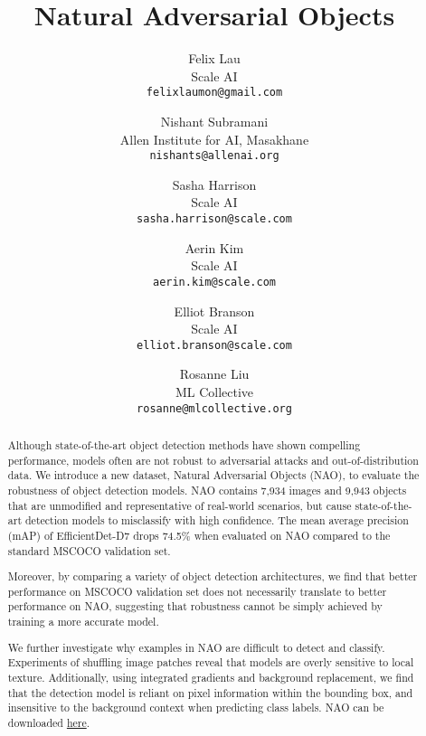 \documentclass[final]{cvpr}
\begin{document}
\title{Natural Adversarial Objects}

\author{Felix Lau\\
Scale AI\\
{\tt\small felixlaumon@gmail.com}
\and
Nishant Subramani\\
Allen Institute for AI, Masakhane\\
{\tt\small nishants@allenai.org}
\and
Sasha Harrison\\
Scale AI\\
{\tt\small sasha.harrison@scale.com}
\and
Aerin Kim\\
Scale AI\\
{\tt\small aerin.kim@scale.com}
\and
Elliot Branson\\
Scale AI\\
{\tt\small elliot.branson@scale.com}
\and
Rosanne Liu\\
ML Collective\\
{\tt\small rosanne@mlcollective.org}
}
\maketitle


\begin{abstract}
Although state-of-the-art object detection methods have shown compelling performance, models often are not robust to adversarial attacks and out-of-distribution data.
We introduce a new dataset, Natural Adversarial Objects (NAO), to evaluate the robustness of object detection models. NAO contains 7,934 images and 9,943 objects that are unmodified and representative of real-world scenarios, but cause state-of-the-art detection models to misclassify with high confidence. 
The mean average precision (mAP) of EfficientDet-D7 drops 74.5\% when evaluated on NAO compared to the standard MSCOCO validation set.

Moreover, by comparing a variety of object detection architectures, we find that better performance on MSCOCO validation set does not necessarily translate to better performance on NAO, suggesting that robustness cannot be simply achieved by training a more accurate model.

We further investigate why examples in NAO are difficult to detect and classify. Experiments of shuffling image patches reveal that models are overly sensitive to local texture. Additionally, using integrated gradients and background replacement, we find that the detection model is reliant on pixel information within the bounding box, and insensitive to the background context when predicting class labels. NAO can be downloaded \href{https://drive.google.com/drive/folders/15P8sOWoJku6SSEiHLEts86ORfytGezi8?usp=sharing}{here}.
\end{abstract}
\end{document}
